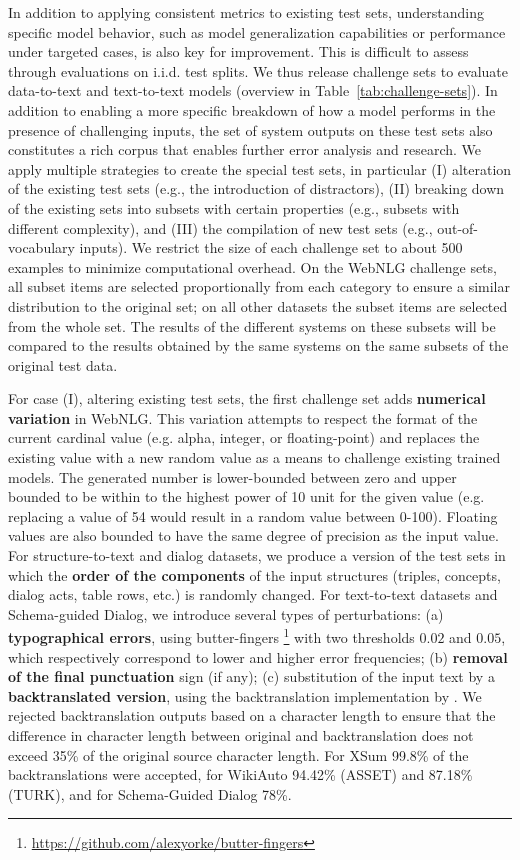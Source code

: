 \documentclass[11pt,a4paper]{article}
\begin{document}
In addition to applying consistent metrics to existing test sets, understanding specific model behavior, such as model generalization capabilities or performance under targeted cases, is also key for improvement. This is difficult to assess through evaluations on i.i.d. test splits. We thus release challenge sets to evaluate data-to-text and text-to-text models (overview in Table~\ref{tab:challenge-sets}). In addition to enabling a more specific breakdown of how a model performs in the presence of challenging inputs, the set of system outputs on these test sets also constitutes a rich corpus that enables further error analysis and research.
We apply multiple strategies to create the special test sets, in particular (I) alteration of the existing test sets (e.g., the introduction of distractors), (II) breaking down of the existing sets into subsets with certain properties (e.g., subsets with different complexity), and (III) the compilation of new test sets (e.g., out-of-vocabulary inputs).
We restrict the size of each challenge set to about 500 examples to minimize computational overhead. On the WebNLG challenge sets, all subset items are selected proportionally from each category to ensure a similar distribution to the original set; on all other datasets the subset items are selected from the whole set. The results of the different systems on these subsets will be compared to the results obtained by the same systems on the same subsets of the original test data. 

For case (I), altering existing test sets, the first challenge set adds \textbf{numerical variation} in WebNLG. This variation attempts to respect the format of the current cardinal value (e.g. alpha, integer, or floating-point) and replaces the existing value with a new random value as a means to challenge existing trained models. The generated number is lower-bounded between zero and upper bounded to be within to the highest power of 10 unit for the given value (e.g. replacing a value of 54 would result in a random value between 0-100). Floating values are also bounded to have the same degree of precision as the input value.  
For structure-to-text and dialog datasets, we produce a version of the test sets in which the \textbf{order of the components} of the input structures (triples, concepts, dialog acts, table rows, etc.) is randomly changed.
For text-to-text datasets and Schema-guided Dialog, we introduce several types of perturbations: (a) \textbf{typographical errors}, using butter-fingers \footnote{\url{https://github.com/alexyorke/butter-fingers}} with two thresholds $0.02$ and $0.05$, which respectively correspond to lower and higher error frequencies; (b) \textbf{removal of the final punctuation} sign (if any); (c) substitution of the input text by a \textbf{backtranslated version}, using the backtranslation implementation by \citet{xie2020unsupervised}. We rejected backtranslation outputs based on a character length to ensure that the difference in character length between original and backtranslation does not exceed 35\% of the original source character length. For XSum 99.8\% of the backtranslations were accepted, for WikiAuto 94.42\% (ASSET) and 87.18\% (TURK), and for Schema-Guided Dialog 78\%.
\end{document}
